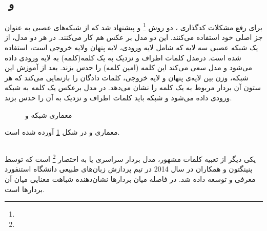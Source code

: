 \subsection{‌ و }
	برای رفع مشکلات کدگذاری 
	، دو روش
	\footnote{}
	\cite{mikolov2013efficient}
	و
	\cite{mikolov2013efficient}
	پیشنهاد شد که از شبکه‌های عصبی به عنوان جز اصلی خود استفاده می‌کنند. این دو مدل بر عکس هم کار می‌کنند.	در هر دو مدل، از یک شبکه عصبی سه لایه که شامل لایه ورودی، لایه پنهان ولایه خروجی است، استفاده شده است. درمدل 
	کلمات اطراف و نزدیک به یک کلمه(کلمه) به لایه ورودی داده می‌شود و مدل سعی می‌کند این کلمه (امین کلمه) را حدس بزند.  بعد از آموزش این شبکه‌، وزن بین لایه‌ی پنهان و لایه خروجی، کلمات دادگان را بازنمایی می‌کند که هر ستون آن بردار مربوط به یک کلمه را نشان می‌دهد. در مدل
	برعکس 
	یک کلمه به شبکه ورودی داده می‌شود و شبکه باید کلمات اطراف و نزدیک به آن را حدس بزند. 
	\begin{figure}
		\caption{
			معماری شبکه 
			و
			\cite{mikolov2013efficient}	
		}
		\label{fig:CBOW&skip-gram}
	\end{figure}
	معماری 
	و
	در شکل 
	\ref{fig:CBOW&skip-gram}
	آورده شده است. 

\subsection{}
	یکی دیگر از تعبیه کلمات مشهور، مدل بردار سراسری یا به اختصار 
	\footnote{}
	است که توسط پنینگتون و همکاران 
	\cite{pennington2014glove}
	در سال 2014 در تیم پردازش زبان‌های طبیعی دانشگاه استنفورد معرفی و توسعه داده شد. در 
	فاصله میان بردار‌ها نشان‌دهنده شباهت معنایی میان آن بردارها است.
	
